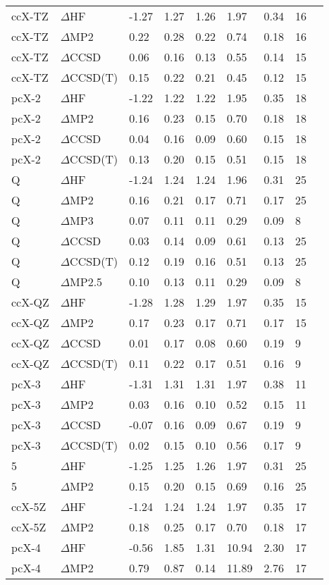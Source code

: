 \begin{table}
\begin{tabular}{l l l l l l l l l }
    ccX-TZ & $\Delta$HF & -1.27 & 1.27 & 1.26 & 1.97 & 0.34 & 16 \\ 
    ccX-TZ & $\Delta$MP2 & 0.22 & 0.28 & 0.22 & 0.74 & 0.18 & 16 \\ 
    ccX-TZ & $\Delta$CCSD & 0.06 & 0.16 & 0.13 & 0.55 & 0.14 & 15 \\ 
    ccX-TZ & $\Delta$CCSD(T) & 0.15 & 0.22 & 0.21 & 0.45 & 0.12 & 15 \\ 
    pcX-2 & $\Delta$HF & -1.22 & 1.22 & 1.22 & 1.95 & 0.35 & 18 \\ 
    pcX-2 & $\Delta$MP2 & 0.16 & 0.23 & 0.15 & 0.70 & 0.18 & 18 \\ 
    pcX-2 & $\Delta$CCSD & 0.04 & 0.16 & 0.09 & 0.60 & 0.15 & 18 \\ 
    pcX-2 & $\Delta$CCSD(T) & 0.13 & 0.20 & 0.15 & 0.51 & 0.15 & 18 \\ 
    Q & $\Delta$HF & -1.24 & 1.24 & 1.24 & 1.96 & 0.31 & 25 \\ 
    Q & $\Delta$MP2 & 0.16 & 0.21 & 0.17 & 0.71 & 0.17 & 25 \\ 
    Q & $\Delta$MP3 & 0.07 & 0.11 & 0.11 & 0.29 & 0.09 & 8 \\ 
    Q & $\Delta$CCSD & 0.03 & 0.14 & 0.09 & 0.61 & 0.13 & 25 \\ 
    Q & $\Delta$CCSD(T) & 0.12 & 0.19 & 0.16 & 0.51 & 0.13 & 25 \\ 
    Q & $\Delta$MP2.5 & 0.10 & 0.13 & 0.11 & 0.29 & 0.09 & 8 \\ 
    ccX-QZ & $\Delta$HF & -1.28 & 1.28 & 1.29 & 1.97 & 0.35 & 15 \\ 
    ccX-QZ & $\Delta$MP2 & 0.17 & 0.23 & 0.17 & 0.71 & 0.17 & 15 \\ 
    ccX-QZ & $\Delta$CCSD & 0.01 & 0.17 & 0.08 & 0.60 & 0.19 & 9 \\ 
    ccX-QZ & $\Delta$CCSD(T) & 0.11 & 0.22 & 0.17 & 0.51 & 0.16 & 9 \\ 
    pcX-3 & $\Delta$HF & -1.31 & 1.31 & 1.31 & 1.97 & 0.38 & 11 \\ 
    pcX-3 & $\Delta$MP2 & 0.03 & 0.16 & 0.10 & 0.52 & 0.15 & 11 \\ 
    pcX-3 & $\Delta$CCSD & -0.07 & 0.16 & 0.09 & 0.67 & 0.19 & 9 \\ 
    pcX-3 & $\Delta$CCSD(T) & 0.02 & 0.15 & 0.10 & 0.56 & 0.17 & 9 \\ 
    5 & $\Delta$HF & -1.25 & 1.25 & 1.26 & 1.97 & 0.31 & 25 \\ 
    5 & $\Delta$MP2 & 0.15 & 0.20 & 0.15 & 0.69 & 0.16 & 25 \\ 
    ccX-5Z & $\Delta$HF & -1.24 & 1.24 & 1.24 & 1.97 & 0.35 & 17 \\ 
    ccX-5Z & $\Delta$MP2 & 0.18 & 0.25 & 0.17 & 0.70 & 0.18 & 17 \\ 
    pcX-4 & $\Delta$HF & -0.56 & 1.85 & 1.31 & 10.94 & 2.30 & 17 \\ 
    pcX-4 & $\Delta$MP2 & 0.79 & 0.87 & 0.14 & 11.89 & 2.76 & 17 \\ 
    \hline
  \end{tabular}
\end{table}
